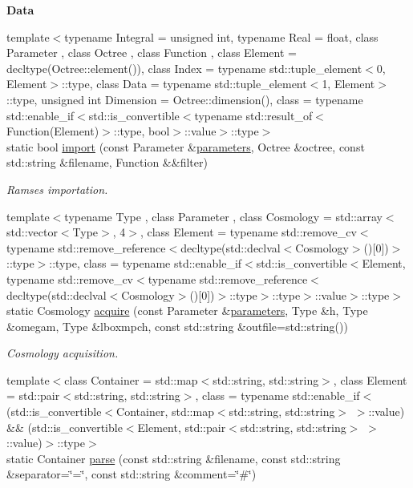 \begin{Indent}{\bf Data}\par
\begin{DoxyCompactItemize}
\item 
{\footnotesize template$<$typename Integral  = unsigned int, typename Real  = float, class Parameter , class Octree , class Function , class Element  = decltype(\-Octree\-::element()), class Index  = typename std\-::tuple\-\_\-element$<$0, Element$>$\-::type, class Data  = typename std\-::tuple\-\_\-element$<$1, Element$>$\-::type, unsigned int Dimension = Octree\-::dimension(), class  = typename std\-::enable\-\_\-if$<$std\-::is\-\_\-convertible$<$typename std\-::result\-\_\-of$<$\-Function(\-Element)$>$\-::type, bool$>$\-::value$>$\-::type$>$ }\\static bool \hyperlink{exceptionInput_adb0a86f9680f6f88311735513b20f1a8}{import} (const Parameter \&\hyperlink{rays_8h_ae1bc8b0b8c8b9f8e4cc61a5cc7c4ce9e}{parameters}, Octree \&octree, const std\-::string \&filename, Function \&\&filter)
\begin{DoxyCompactList}\small\item\em Ramses importation. \end{DoxyCompactList}\item 
{\footnotesize template$<$typename Type , class Parameter , class Cosmology  = std\-::array$<$std\-::vector$<$\-Type$>$, 4$>$, class Element  = typename std\-::remove\-\_\-cv$<$typename std\-::remove\-\_\-reference$<$decltype(std\-::declval$<$\-Cosmology$>$()\mbox{[}0\mbox{]})$>$\-::type$>$\-::type, class  = typename std\-::enable\-\_\-if$<$std\-::is\-\_\-convertible$<$\-Element, typename std\-::remove\-\_\-cv$<$typename std\-::remove\-\_\-reference$<$decltype(std\-::declval$<$\-Cosmology$>$()\mbox{[}0\mbox{]})$>$\-::type$>$\-::type$>$\-::value$>$\-::type$>$ }\\static Cosmology \hyperlink{exceptionInput_a3070c31dd06673df4c9229219c4a1819}{acquire} (const Parameter \&\hyperlink{rays_8h_ae1bc8b0b8c8b9f8e4cc61a5cc7c4ce9e}{parameters}, Type \&h, Type \&omegam, Type \&lboxmpch, const std\-::string \&outfile=std\-::string())
\begin{DoxyCompactList}\small\item\em Cosmology acquisition. \end{DoxyCompactList}\item 
{\footnotesize template$<$class Container  = std\-::map$<$std\-::string, std\-::string$>$, class Element  = std\-::pair$<$std\-::string, std\-::string$>$, class  = typename std\-::enable\-\_\-if$<$(std\-::is\-\_\-convertible$<$\-Container, std\-::map$<$std\-::string, std\-::string$>$ $>$\-::value) \&\& (std\-::is\-\_\-convertible$<$\-Element, std\-::pair$<$std\-::string, std\-::string$>$ $>$\-::value)$>$\-::type$>$ }\\static Container \hyperlink{exceptionInput_a90f26f7b7be815de44151066b8cb669d}{parse} (const std\-::string \&filename, const std\-::string \&separator=\char`\"{}=\char`\"{}, const std\-::string \&comment=\char`\"{}\#\char`\"{})

\end{DoxyCompactItemize}
\end{Indent}
